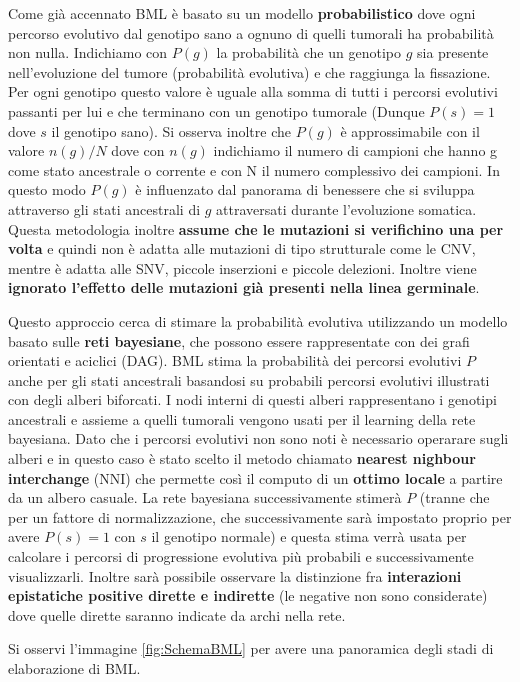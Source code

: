 \documentclass[a4paper]{article}
\begin{document}
	Come già accennato BML è basato su un modello \textbf{probabilistico} dove ogni percorso evolutivo dal genotipo sano a ognuno di quelli tumorali ha probabilità non nulla. 
	Indichiamo con $P(g)$ la probabilità che un genotipo $g$ sia presente nell'evoluzione del tumore (probabilità evolutiva) e che raggiunga la fissazione.
	Per ogni genotipo questo valore è uguale alla somma di tutti i percorsi evolutivi passanti per lui e che terminano con un genotipo tumorale (Dunque $P(s)=1$ dove $s$ il genotipo sano).
	Si osserva inoltre che $P(g)$ è approssimabile con il valore $n(g)/N$ dove con $n(g)$ indichiamo il numero di campioni che hanno g come stato ancestrale o corrente e con N il numero complessivo dei campioni. 
	In questo modo $P(g)$ è influenzato dal panorama di benessere che si sviluppa attraverso gli stati ancestrali di $g$ attraversati durante l'evoluzione somatica. Questa metodologia inoltre 
	\textbf{assume che le mutazioni si verifichino una per volta} e quindi non è adatta alle mutazioni di tipo strutturale come le CNV, mentre è adatta alle SNV, piccole inserzioni e piccole delezioni.
	Inoltre viene \textbf{ignorato l'effetto delle mutazioni già presenti nella linea germinale}. 

	Questo approccio cerca di stimare la probabilità evolutiva utilizzando un modello basato sulle \textbf{reti bayesiane},
	che possono essere rappresentate con dei grafi orientati e aciclici (DAG). BML stima la probabilità dei percorsi evolutivi $P$ 
	anche per gli stati ancestrali basandosi su probabili percorsi evolutivi illustrati con degli alberi biforcati. 
	I nodi interni di questi alberi rappresentano i genotipi ancestrali e assieme a quelli tumorali vengono usati per il learning della rete bayesiana. 
	Dato che i percorsi evolutivi non sono noti è necessario operarare sugli alberi e in questo caso è stato scelto il metodo chiamato  \textbf{nearest nighbour interchange} 
	(NNI) che permette così il computo di un \textbf{ottimo locale} a partire da un albero casuale. La rete bayesiana successivamente stimerà $P$ (tranne che per un fattore di normalizzazione,
	che successivamente sarà impostato proprio per avere $P(s)=1$ con $s$ il genotipo normale) e questa stima verrà usata per calcolare i percorsi di progressione evolutiva più probabili
	e successivamente visualizzarli. Inoltre sarà possibile osservare la distinzione fra \textbf{interazioni epistatiche positive dirette e indirette} (le negative non sono considerate) 
	dove quelle dirette saranno indicate da archi nella rete.

	Si osservi l'immagine \ref{fig:SchemaBML} per avere una panoramica degli stadi di elaborazione di BML.
\end{document}
